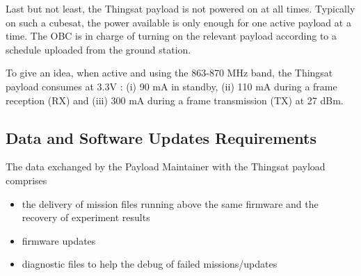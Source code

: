 Last but not least, the Thingsat payload is not powered on at all times.
Typically on such a cubesat, the power available is only
enough for one active payload at a time. 
The OBC is in charge of turning on the relevant payload according to a schedule
uploaded from the ground station. 

To give an idea, when active and using the 863-870 MHz band, the
Thingsat payload consumes at 3.3V : 
(i) 90 mA in standby, 
(ii) 110 mA during a frame reception (RX) and 
(iii) 300 mA during a frame transmission (TX) at 27 dBm.

\subsection{Data and Software Updates Requirements}


The data exchanged by the Payload Maintainer with the Thingsat payload comprises 
\begin{itemize}
    \item the delivery of mission files running above the same firmware and the
    recovery of experiment results
    \item firmware updates
    \item diagnostic files to help the debug of failed missions/updates
\end{itemize} 


